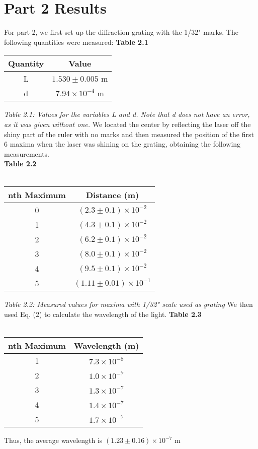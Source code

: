 \documentclass[leqno]{article}
\begin{document}
\section*{Part 2 Results}
For part 2, we first set up the diffraction grating with the 1/32" marks.
The following quantities were measured:
\textbf{Table 2.1}
\begin{tabular}{c|c}
	Quantity & Value\\
	\hline
	L & $1.530\pm0.005$ m\\
	d & $7.94\times10^{-4}$ m
\end{tabular}
\textit{\small Table 2.1: Values for the variables L and d.  Note that d does not have an error, as it was given without one.}
We located the center by reflecting the laser off the shiny part of the ruler with no marks and then measured the position of the first 6 maxima when the laser was shining on the grating, obtaining the following measurements.\\
\textbf{Table 2.2}\\\\
\begin{tabular}{|c|c|}
	\hline
	nth Maximum & Distance (m)\\
	\hline
	0 & $(2.3\pm0.1) \times 10^{-2}$\\
	\hline
	1 & $(4.3\pm0.1)\times 10^{-2}$\\ 
	\hline
	2 & $(6.2\pm0.1)\times 10^{-2}$\\ 
	\hline
	3 & $(8.0\pm0.1)\times 10^{-2}$\\ 
	\hline
	4 & $(9.5\pm0.1)\times 10^{-2}$\\ 
	\hline
	5 & $(1.11\pm0.01)\times 10^{-1}$\\
	\hline
\end{tabular}
\textit{\small Table 2.2: Measured values for maxima with 1/32" scale used as grating}
We then used Eq. (2) to calculate the wavelength of the light.
\textbf{Table 2.3}\\\\
\begin{tabular}{|c|c|}
	\hline
	nth Maximum & Wavelength (m)\\
	\hline
	1 & $7.3\times 10^{-8}$\\ 
	\hline
	2 & $1.0\times 10^{-7}$\\ 
	\hline
	3 & $1.3\times 10^{-7}$\\ 
	\hline
	4 & $1.4\times 10^{-7}$\\ 
	\hline
	5 & $1.7\times 10^{-7}$\\
	\hline
\end{tabular}
Thus, the average wavelength is $(1.23\pm0.16)\times 10^{-7}$ m
\end{document}
